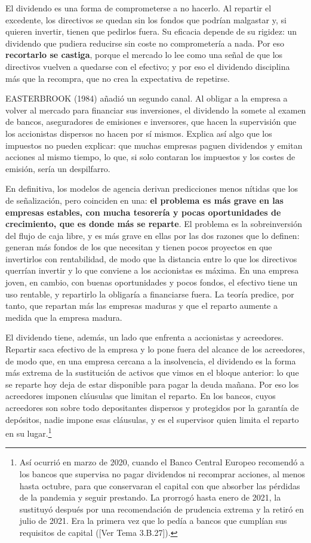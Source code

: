 \documentclass[10pt,a4paper]{article}
\newcommand{\authorfont}[1]{{\fontfamily{EBGaramond-TLF}\selectfont #1}}
\begin{document}
El dividendo es una forma de comprometerse a no hacerlo. Al repartir el excedente, los directivos se quedan sin los fondos que podrían malgastar y, si quieren invertir, tienen que pedirlos fuera. Su eficacia depende de su rigidez: un dividendo que pudiera reducirse sin coste no comprometería a nada. Por eso \textbf{recortarlo se castiga}, porque el mercado lo lee como una señal de que los directivos vuelven a quedarse con el efectivo; y por eso el dividendo disciplina más que la recompra, que no crea la expectativa de repetirse.

EASTERBROOK (1984) añadió un segundo canal. Al obligar a la empresa a volver al mercado para financiar sus inversiones, el dividendo la somete al examen de bancos, aseguradores de emisiones e inversores, que hacen la supervisión que los accionistas dispersos no hacen por sí mismos. Explica así algo que los impuestos no pueden explicar: que muchas empresas paguen dividendos y emitan acciones al mismo tiempo, lo que, si solo contaran los impuestos y los costes de emisión, sería un despilfarro.

En definitiva, los modelos de agencia derivan predicciones menos nítidas que los de señalización, pero coinciden en una: \textbf{el problema es más grave en las empresas estables, con mucha tesorería y pocas oportunidades de crecimiento, que es donde más se reparte}. El problema es la sobreinversión del flujo de caja libre, y es más grave en ellas por las dos razones que lo definen: generan más fondos de los que necesitan y tienen pocos proyectos en que invertirlos con rentabilidad, de modo que la distancia entre lo que los directivos querrían invertir y lo que conviene a los accionistas es máxima. En una empresa joven, en cambio, con buenas oportunidades y pocos fondos, el efectivo tiene un uso rentable, y repartirlo la obligaría a financiarse fuera. La teoría predice, por tanto, que repartan más las empresas maduras y que el reparto aumente a medida que la empresa madura.

El dividendo tiene, además, un lado que enfrenta a accionistas y acreedores. Repartir saca efectivo de la empresa y lo pone fuera del alcance de los acreedores, de modo que, en una empresa cercana a la insolvencia, el dividendo es la forma más extrema de la sustitución de activos que vimos en el bloque anterior: lo que se reparte hoy deja de estar disponible para pagar la deuda mañana. Por eso los acreedores imponen cláusulas que limitan el reparto. En los bancos, cuyos acreedores son sobre todo depositantes dispersos y protegidos por la garantía de depósitos, nadie impone esas cláusulas, y es el supervisor quien limita el reparto en su lugar.\footnote{%
    Así ocurrió en marzo de 2020, cuando el Banco Central Europeo recomendó a los bancos que supervisa no pagar dividendos ni recomprar acciones, al menos hasta octubre, para que conservaran el capital con que absorber las pérdidas de la pandemia y seguir prestando. La prorrogó hasta enero de 2021, la sustituyó después por una recomendación de prudencia extrema y la retiró en julio de 2021. Era la primera vez que lo pedía a bancos que cumplían sus requisitos de capital ([\authorfont{Ver Tema 3.B.27}]).
}
\end{document}
